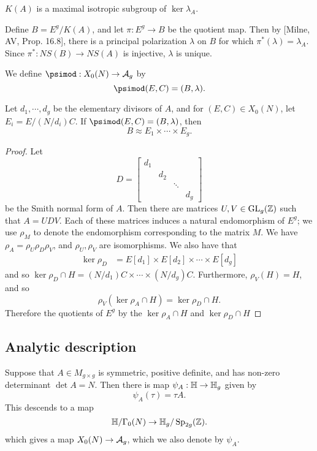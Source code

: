 \documentclass{amsart}
\begin{document}
\begin{lemma}
  $K(A)$ is a maximal isotropic subgroup of $\ker \lambda_A$.
\end{lemma}

Define $B = E^g/K(A)$, and let $\pi: E^g \to B$ be the quotient map. Then by [Milne, AV, Prop. 16.8], there is a principal polarization $\lambda$ on $B$ for which $\pi^*(\lambda) = \lambda_A$. Since $\pi^*: NS(B) \to NS(A)$ is injective, $\lambda$ is unique.

We define $\psimod: X_0(N) \to \ag$ by
\[
  \psimod(E,C) = (B,\lambda).
\]

\begin{proposition}
  Let $d_1, \cdots, d_g$ be the elementary divisors of $A$, and for $(E,C) \in X_0(N)$, let $E_i = E/(N/d_i)C$. If $\psimod(E,C) = (B,\lambda)$, then
  \[
    B \approx E_1 \times \cdots \times E_g.
  \]
\end{proposition}

\begin{proof}
  Let
   \[
     D =
    \begin{bmatrix}
      {d_1} & & & \\
      & {d_2} & & \\
      & & \ddots & \\
      & & & {d_{g}}
    \end{bmatrix}
  \]
  be the Smith normal form of $A$. Then there are matrices $U,V \in \operatorname{GL}_g(\mathbb{Z})$ such that $A = UDV$. Each of these matrices induces a natural endomorphism of $E^g$; we use $\rho_M$ to denote the endomorphism corresponding to the matrix $M$. We have $\rho_A = \rho_U \rho_D \rho_V$, and $\rho_U, \rho_V$ are isomorphisms. We also have that
  \begin{align*}
    \ker \rho_D &= E[d_1] \times E[d_2] \times \cdots \times E[d_g]
  \end{align*}
  and so $\ker \rho_D \cap H = (N/d_1)C \times \cdots \times (N/d_g)C$. Furthermore, $\rho_V(H) = H$, and so
  \[
    \rho_V(\ker \rho_A \cap H) = \ker \rho_D \cap H.
  \]
  Therefore the quotients of $E^g$ by the $\ker \rho_A \cap H$ and $\ker \rho_D \cap H$ 
\end{proof}

\subsection{Analytic description}
\label{sec:ana-desc}

Suppose that $A \in M_{g \times g}$ is symmetric, positive definite, and has non-zero determinant $\det A = N$. Then there is map $\psi_A: \mathbb{H} \to \mathbb{H}_g$ given by
\[
  \psi_A(\tau) = \tau A.
\]
This descends to a map
\begin{equation}\label{def:psi-A-n}
  \mathbb{H}/\Gamma_0(N) \to \mathbb{H}_g/\operatorname{Sp}_{2g}(\mathbb{Z}).
\end{equation}
which gives a map $X_0(N) \to \mathcal{A}_g$, which we also denote by $\psi_{A}$.
\end{document}
